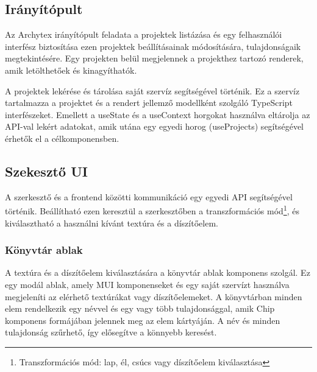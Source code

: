 \subsection{Irányítópult}
Az Archytex irányítópult feladata a projektek listázása és egy felhasználói interfész biztosítása ezen projektek beállításainak módosítására, tulajdonságaik megtekintésére. Egy projekten belül megjelennek a projekthez tartozó renderek, amik letölthetőek és kinagyíthatók.

A projektek lekérése és tárolása saját szervíz segítségével történik. Ez a szervíz tartalmazza a projektet és a rendert jellemző modellként szolgáló TypeScript interfészeket. Emellett a useState és a useContext horgokat használva eltárolja az API-val lekért adatokat, amik utána egy egyedi horog (useProjects) segítségével érhetők el a célkomponensben.

\subsection{Szekesztő UI}
A szerkesztő és a frontend közötti kommunikáció egy egyedi API segítségével történik. Beállítható ezen keresztül a szerkesztőben a transzformációs mód\footnote{Transzformációs mód: lap, él, csúcs vagy díszítőelem kiválasztása}, és kiválasztható a használni kívánt textúra és a díszítőelem.

\subsubsection{Könyvtár ablak}
A textúra és a díszítőelem kiválasztására a könyvtár ablak komponens szolgál. Ez egy modál ablak, amely MUI komponenseket és egy saját szervízt használva megjeleníti az elérhető textúrákat vagy díszítőelemeket. A könyvtárban minden elem rendelkezik egy névvel és egy vagy több tulajdonsággal, amik Chip komponens formájában jelennek meg az elem kártyáján. A név és minden tulajdonság szűrhető, így elősegítve a könnyebb keresést.

